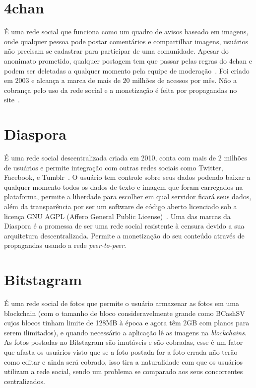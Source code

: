 \section{4chan}

É uma rede social que funciona como um quadro de avisos baseado em imagens, onde qualquer pessoa pode postar comentários e compartilhar imagens, usuários não precisam se cadastrar para participar de uma comunidade.
Apesar do anonimato prometido, qualquer postagem tem que passar pelas regras do 4chan e podem ser deletadas a qualquer momento pela equipe de moderação~\cite{4chan1}.
Foi criado em 2003 e alcança a marca de mais de 20 milhões de acessos por mês. Não a cobrança pelo uso da rede social e a monetização é feita por propagandas no site~\cite{4chan2}.

\section{Diaspora}

É uma rede social descentralizada criada em 2010, conta com mais de 2 milhões de usuários e permite integração com outras redes sociais como Twitter, Facebook, e Tumblr~\cite{Diaspora1}.
O usuário tem controle sobre seus dados podendo baixar a qualquer momento todos os dados de texto e imagem que foram carregados na plataforma, permite a liberdade para escolher em qual servidor ficará seus dados, além da transparência por ser um software de código aberto licenciado sob a licença GNU AGPL (Affero General Public License)~\cite{Diaspora2}. 
Uma das marcas da Diaspora é a promessa de ser uma rede social resistente à censura devido a sua arquitetura descentralizada.
Permite a monetização do seu conteúdo através de propagandas usando a rede \textit{peer-to-peer}.

\section{Bitstagram}

É uma rede social de fotos que permite o usuário armazenar as fotos em uma blockchain (com o tamanho de bloco consideravelmente grande como BCashSV~\cite{BTCSV} cujos blocos tinham limite de 128MB à época e agora têm 2GB com planos para serem ilimitados), e quando necessário a aplicação lê as imagens na \textit{blockchains}.
As fotos postadas no Bitstagram são imutáveis e são cobradas, esse é um fator que afasta os usuários visto que se a foto postada for a foto errada não terão como editar e ainda será cobrado, isso tira a naturalidade com que os usuários utilizam a rede social, sendo um problema se comparado aos seus concorrentes centralizados.

